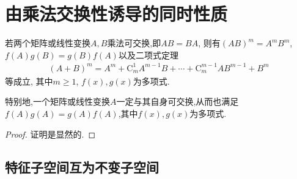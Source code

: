 \documentclass[../../main.tex]{subfiles}%
\begin{document}
\section{由乘法交换性诱导的同时性质}

\begin{proposition}[矩阵乘法可交换的基本性质]\label{proposition:矩阵乘法可交换的基本性质}
若两个矩阵或线性变换$A,B$乘法可交换,即\(AB = BA\), 则有\((AB)^{m}=A^{m}B^{m}\), \(f(A)g(B)=g(B)f(A)\)以及二项式定理
\begin{align*}
(A + B)^{m}=A^{m}+\mathrm{C}_{m}^{1}A^{m - 1}B+\cdots+\mathrm{C}_{m}^{m - 1}AB^{m - 1}+B^{m}
\end{align*}
等成立, 其中\(m \geqslant  1\), \(f(x),g(x)\)为多项式. 

特别地,一个矩阵或线性变换$A$一定与其自身可交换,从而也满足\(f(A)g(A)=g(A)f(A)\),其中\(f(x),g(x)\)为多项式.
\end{proposition}
\begin{proof}

证明是显然的.

\end{proof}

\subsection{特征子空间互为不变子空间}
\end{document}
